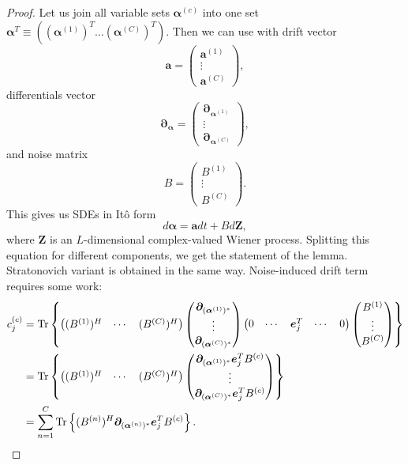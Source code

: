 \begin{proof}
Let us join all variable sets $\bm{\alpha}^{(c)}$ into one set $\bm{\alpha}^T \equiv ((\bm{\alpha}^{(1)})^T \ldots (\bm{\alpha}^{(C)})^T)$.
Then we can use  with drift vector
\[
	\bm{a} = \begin{pmatrix}
		\bm{a}^{(1)} \\ \vdots \\ \bm{a}^{(C)}
	\end{pmatrix},
\]
differentials vector
\[
	\bm{\partial}_{\bm{\alpha}} = \begin{pmatrix}
		\bm{\partial}_{\bm{\alpha}^{(1)}} \\ \vdots \\ \bm{\partial}_{\bm{\alpha}^{(C)}}
	\end{pmatrix},
\]
and noise matrix
\[
	B = \begin{pmatrix}
		B^{(1)} \\ \vdots \\ B^{(C)}
	\end{pmatrix}.
\]
This gives us SDEs in It\^{o} form
\[
	d\bm{\alpha} = \bm{a} dt + B d\bm{Z},
\]
where $\bm{Z}$ is an $L$-dimensional complex-valued Wiener process.
Splitting this equation for different components, we get the statement of the lemma.
Stratonovich variant is obtained in the same way.
Noise-induced drift term requires some work:
\begin{equation*}
\begin{split}
	c_j^{(c)}
	& = \mathrm{Tr} \left\{ 
		\begin{pmatrix} (B^{(1)})^H & \cdots & (B^{(C)})^H \end{pmatrix}
		\begin{pmatrix}
			\bm{\partial}_{(\bm{\alpha}^{(1)})^*} \\
			\vdots \\
			\bm{\partial}_{(\bm{\alpha}^{(C)})^*}
		\end{pmatrix}
		\begin{pmatrix} 0 & \cdots & \bm{e}_j^T & \cdots & 0 \end{pmatrix}
		\begin{pmatrix}
			B^{(1)} \\
			\vdots \\
			B^{(C)}
		\end{pmatrix}
	 \right\} \\
	& = \mathrm{Tr} \left\{ 
		\begin{pmatrix} (B^{(1)})^H & \cdots & (B^{(C)})^H \end{pmatrix}
		\begin{pmatrix}
			\bm{\partial}_{(\bm{\alpha}^{(1)})^*} \bm{e}_j^T B^{(c)} \\
			\vdots \\
			\bm{\partial}_{(\bm{\alpha}^{(C)})^*} \bm{e}_j^T B^{(c)}
		\end{pmatrix}
	 \right\} \\
	& = \sum_{n=1}^C \mathrm{Tr} \left\{ 
		(B^{(n)})^H
		\bm{\partial}_{(\bm{\alpha}^{(n)})^*}
		\bm{e}_j^T
		B^{(c)}
	 \right\}.
\end{split}
\end{equation*}
\end{proof}

